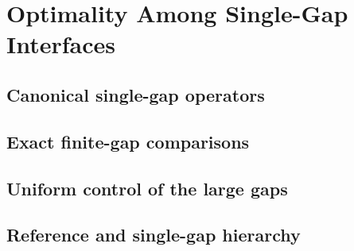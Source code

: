 \section{Optimality Among Single-Gap Interfaces}
\label{sec:single-gap}

\subsection{Canonical single-gap operators}
\label{subsec:canonical-single-gap-operators}
\TaskDraftStub

\subsection{Exact finite-gap comparisons}
\label{subsec:exact-finite-gap-comparisons}
\TaskDraftStub

\subsection{Uniform control of the large gaps}
\label{subsec:uniform-large-gap-control}
\TaskDraftStub

\subsection{Reference and single-gap hierarchy}
\label{subsec:reference-single-gap-hierarchy}
\TaskDraftStub
